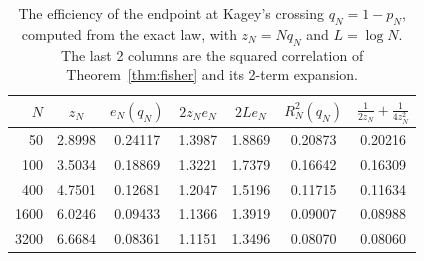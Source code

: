 \begin{table}[ht]
\centering\small
\begin{tabular}{@{}rcccccc@{}}
\toprule
$N$ & $z_N$ & $e_N(q_N)$ & $2z_Ne_N$ & $2Le_N$ & $R^2_N(q_N)$
 & $\frac1{2z_N}+\frac1{4z_N^2}$\\
\midrule
50 & 2.8998 & 0.24117 & 1.3987 & 1.8869 & 0.20873 & 0.20216\\
100 & 3.5034 & 0.18869 & 1.3221 & 1.7379 & 0.16642 & 0.16309\\
400 & 4.7501 & 0.12681 & 1.2047 & 1.5196 & 0.11715 & 0.11634\\
1600 & 6.0246 & 0.09433 & 1.1366 & 1.3919 & 0.09007 & 0.08988\\
3200 & 6.6684 & 0.08361 & 1.1151 & 1.3496 & 0.08070 & 0.08060\\
\bottomrule
\end{tabular}
\caption{The efficiency of the endpoint at Kagey's crossing $q_N=1-p_N$,
computed from the exact law, with $z_N=Nq_N$ and $L=\log N$. The last 2
columns are the squared correlation of Theorem~\ref{thm:fisher} and its
2-term expansion.}
\label{tab:fisher}
\end{table}
